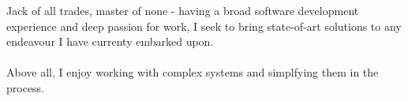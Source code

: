 \documentclass[9pt]{style/developercv}
\begin{document}
\begin{minipage}[t]{0.4\textwidth} %
	\vspace{-\baselineskip} %
	
	Jack of all trades, master of none - having a broad software development experience 
	and deep passion for work, I seek to bring state-of-art solutions to any endeavour
	I have currenty embarked upon. \\ \\
	Above all, I enjoy working with complex systems and simplfying them in the process.

\end{minipage}
\hfill %
\begin{minipage}[t]{0.5\textwidth} %
	\vspace{-\baselineskip} %
	\begin{barchart}{5.5}
	\end{barchart}
\end{minipage}

\vspace{1cm}

\end{document}

